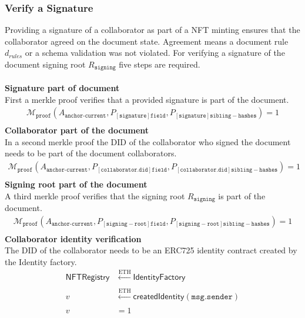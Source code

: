 \subsubsection{Verify a Signature}
Providing a signature of a collaborator as part of a NFT minting ensures that the collaborator agreed on the document state. Agreement means a document rule $d_{rules}$ or a schema validation was not violated. For verifying a signature of the document signing root $R_\mathtt{signing}$ five steps are required.\\\\
\textbf{Signature part of document} \\
First a merkle proof verifies that a provided signature is part of the document.
\begin{equation}
\begin{split}
\mathcal{M}_{\texttt{proof}}(A_{\texttt{anchor-current}} ,P_{[\mathtt{signature}]\mathtt{field}},P_{[\mathtt{signature}]\mathtt{sibling-hashes}}) = 1 \\
\end{split}
\end{equation}
\textbf{Collaborator part of the document} \\
In a second merkle proof the DID of the collaborator who signed the document needs to be part of the document collaborators.
\begin{equation}
\begin{split}
\mathcal{M}_{\texttt{proof}}(A_{\texttt{anchor-current}} ,P_{[\mathtt{collaborator.did}]\mathtt{field}},P_{[\mathtt{collaborator.did}]\mathtt{sibling-hashes}}) = 1 \\
\end{split}
\end{equation}
\textbf{Signing root part of the document} \\
A third merkle proof verifies that the signing root $R_\mathtt{signing}$ is part of the document.
\begin{equation}
\begin{split}
\mathcal{M}_{\texttt{proof}}(A_{\texttt{anchor-current}} ,P_{[\mathtt{signing-root}]\mathtt{field}},P_{[\mathtt{signing-root}]\mathtt{sibling-hashes}}) = 1 \\
\end{split}
\end{equation}
\textbf{Collaborator identity verification} \\
The DID of the collaborator needs to be an ERC725 identity contract created by the Identity factory.
\begin{equation}
\begin{split}
\mathsf{NFTRegistry} &\xleftarrow[]{\text{ETH}}  \mathsf{IdentityFactory} \\
v &\xleftarrow[]{\text{ETH}} \textsf{createdIdentity}(\mathtt{msg.sender}) \\
v & = 1
\end{split}
\end{equation}
